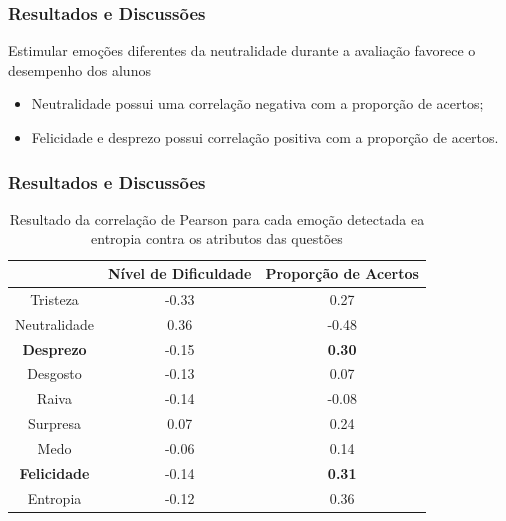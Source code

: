 \documentclass{beamer}
\begin{document}
\begin{frame}
\frametitle{Resultados e Discuss\~oes}
\begin{block}{Estimular emo\c{c}\~oes diferentes da neutralidade durante a avalia\c{c}\~ao favorece o desempenho dos alunos}
\begin{itemize}
\item Neutralidade possui uma correla\c{c}\~ao negativa com a propor\c{c}\~ao de acertos;
\pause
\item Felicidade e desprezo possui correla\c{c}\~ao positiva com a propor\c{c}\~ao de acertos.
\end{itemize}
\end{block}

\end{frame}

\begin{frame}
\frametitle{Resultados e Discuss\~oes}
\begin{table}[]\footnotesize
\centering
\caption{Resultado​ ​da​ ​correla\c{c}\~ao​ ​de​ ​Pearson​ ​para​ ​cada​ ​emo\c{c}\~ao​ ​detectada
e​ ​a​ ​entropia​ ​contra​ ​os​ ​atributos​ ​das​ ​quest\~oes}
\label{my-label}
\begin{tabular}{|c|c|c|}
\hline
                      & \textbf{Nível de Dificuldade} & \textbf{Proporção de Acertos} \\ \hline
Tristeza	     & -0.33                & 0.27                          \\ \hline
Neutralidade & 0.36                 & -0.48                \\ \hline
\small \textbf{Desprezo}     		& -0.15                         & \small \textbf{0.30}                 \\ \hline
Desgosto              & -0.13                         & 0.07                          \\ \hline
Raiva                 & -0.14                         & -0.08                         \\ \hline
Surpresa              & 0.07                          & 0.24                          \\ \hline
Medo                  & -0.06                         & 0.14                          \\ \hline
\small \textbf{Felicidade}   		& -0.14                         & \small \textbf{0.31}                 \\ \hline
Entropia     		& -0.12                         & 0.36                 \\ \hline
\end{tabular}
\end{table}
\end{frame}
\end{document}
